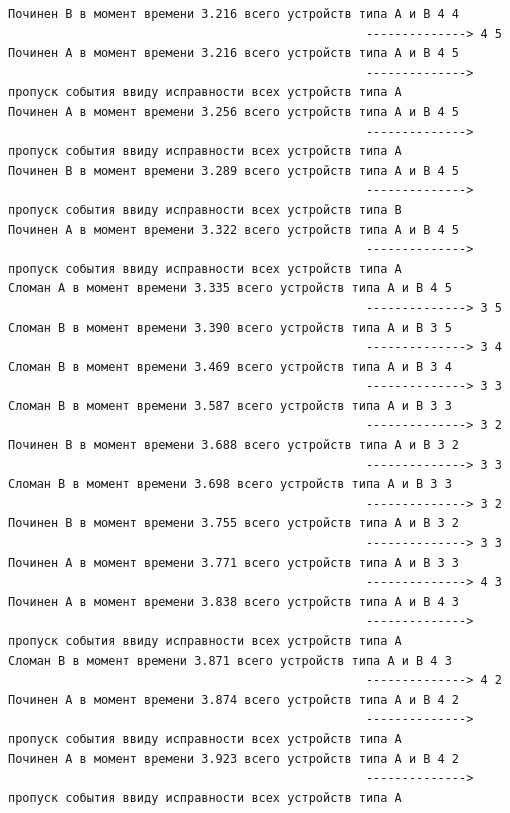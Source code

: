 \begin{verbatim}
Починен B в момент времени 3.216 всего устройств типа А и В 4 4
                                                  --------------> 4 5
Починен A в момент времени 3.216 всего устройств типа А и В 4 5
                                                  --------------> пропуск события ввиду исправности всех устройств типа А
Починен A в момент времени 3.256 всего устройств типа А и В 4 5
                                                  --------------> пропуск события ввиду исправности всех устройств типа А
Починен B в момент времени 3.289 всего устройств типа А и В 4 5
                                                  --------------> пропуск события ввиду исправности всех устройств типа В
Починен A в момент времени 3.322 всего устройств типа А и В 4 5
                                                  --------------> пропуск события ввиду исправности всех устройств типа А
Сломан A в момент времени 3.335 всего устройств типа А и В 4 5
                                                  --------------> 3 5
Сломан B в момент времени 3.390 всего устройств типа А и В 3 5
                                                  --------------> 3 4
Сломан B в момент времени 3.469 всего устройств типа А и В 3 4
                                                  --------------> 3 3
Сломан B в момент времени 3.587 всего устройств типа А и В 3 3
                                                  --------------> 3 2
Починен B в момент времени 3.688 всего устройств типа А и В 3 2
                                                  --------------> 3 3
Сломан B в момент времени 3.698 всего устройств типа А и В 3 3
                                                  --------------> 3 2
Починен B в момент времени 3.755 всего устройств типа А и В 3 2
                                                  --------------> 3 3
Починен A в момент времени 3.771 всего устройств типа А и В 3 3
                                                  --------------> 4 3
Починен A в момент времени 3.838 всего устройств типа А и В 4 3
                                                  --------------> пропуск события ввиду исправности всех устройств типа А
Сломан B в момент времени 3.871 всего устройств типа А и В 4 3
                                                  --------------> 4 2
Починен A в момент времени 3.874 всего устройств типа А и В 4 2
                                                  --------------> пропуск события ввиду исправности всех устройств типа А
Починен A в момент времени 3.923 всего устройств типа А и В 4 2
                                                  --------------> пропуск события ввиду исправности всех устройств типа А

\end{verbatim}
